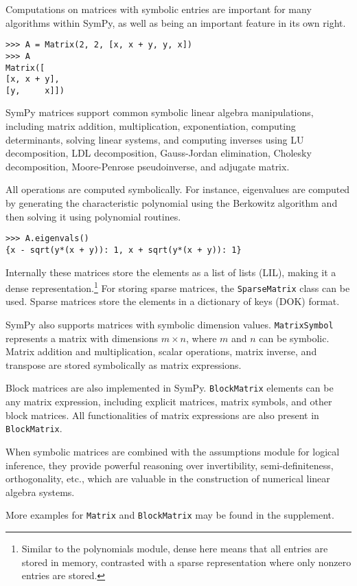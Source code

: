 Computations on matrices with symbolic entries are important for many algorithms
within SymPy, as well as being an important feature in its own right.
\begin{verbatim}
>>> A = Matrix(2, 2, [x, x + y, y, x])
>>> A
Matrix([
[x, x + y],
[y,     x]])
\end{verbatim}

SymPy matrices support common symbolic linear algebra manipulations, including
matrix addition, multiplication, exponentiation, computing determinants,
solving linear systems, and computing inverses using LU decomposition, LDL
decomposition, Gauss-Jordan elimination, Cholesky decomposition, Moore-Penrose
pseudoinverse, and adjugate matrix.

All operations are computed symbolically. For instance, eigenvalues are computed
by generating the characteristic polynomial using the Berkowitz algorithm and
then solving it using polynomial routines.

\begin{verbatim}
>>> A.eigenvals()
{x - sqrt(y*(x + y)): 1, x + sqrt(y*(x + y)): 1}
\end{verbatim}

Internally these matrices store the elements as a list of lists (LIL), making
it a dense representation.\footnote{Similar to the polynomials module, dense
  here means that all entries are stored in memory, contrasted with a sparse
  representation where only nonzero entries are stored.} For storing sparse
matrices, the \verb|SparseMatrix| class can be used. Sparse matrices store the
elements in a dictionary of keys (DOK) format.

SymPy also supports matrices with symbolic dimension values. \verb|MatrixSymbol|
represents a matrix with dimensions $m\times n$, where $m$ and $n$ can be
symbolic. Matrix addition and multiplication, scalar operations, matrix inverse,
and transpose are stored symbolically as matrix expressions.

Block matrices are also implemented in SymPy. \verb|BlockMatrix| elements can
be any matrix expression, including explicit matrices, matrix symbols, and
other block matrices. All functionalities of matrix expressions are also
present in \verb|BlockMatrix|.

When symbolic matrices are combined with the assumptions module for logical
inference, they provide powerful reasoning over invertibility,
semi-definiteness, orthogonality, etc., which are valuable in the construction
of numerical linear algebra systems.

More examples for \verb|Matrix| and \verb|BlockMatrix| may be found in the
supplement.
